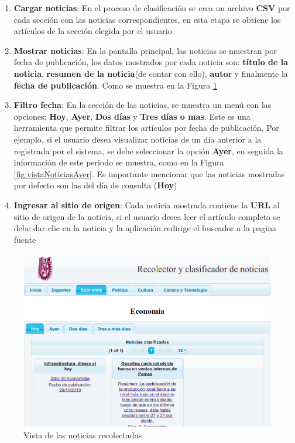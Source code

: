 \begin{enumerate}

	\item \textbf{Cargar noticias}: En el proceso de clasificación se crea un archivo \textbf{CSV} por cada sección con las noticias correspondientes, en esta etapa se obtiene los artículos de la sección elegida por el usuario

	\item \textbf{Mostrar noticias}: En la pantalla principal, las noticias se muestran por fecha de publicación, los datos mostrados por cada noticia son: \textbf{título de la noticia}, \textbf{resumen de la noticia}(de contar con ello), \textbf{autor} y finalmente la \textbf{fecha de publicación}. Como se muestra en la Figura \ref{fig:vistaNoticias}


	\item \textbf{Filtro fecha}: En la sección de las noticias, se muestra un menú con las opciones: \textbf{Hoy}, \textbf{Ayer}, \textbf{Dos días} y \textbf{Tres días o mas}. Este es una herramienta que permite filtrar los artículos por fecha de publicación. Por ejemplo, si el usuario desea visualizar noticias de un día anterior a la registrada por el sistema, se debe seleccionar la opción \textbf{Ayer}, en seguida la información de este periodo se muestra, como en la Figura \ref{fig:vistaNoticiasAyer}. Es importante mencionar que las noticias mostradas por defecto son las del día de consulta (\textbf{Hoy})

	\item \textbf{Ingresar al sitio de origen}: Cada noticia mostrada contiene la \textbf{URL} al sitio de origen de la noticia, si el usuario desea leer el artículo completo se debe dar clic en la noticia y la aplicación redirige el buscador a la pagina fuente

\end{enumerate}


\begin{figure}[H]
\centering
\includegraphics[scale=0.45]{imagenes/noticiasDeHoy.png}
\caption{Vista de las noticias recolectadas}
\label{fig:vistaNoticias}
\end{figure}




